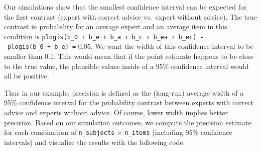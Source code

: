 \documentclass[
  man,floatsintext]{apa6}
\begin{document}
Our simulations show that the smallest confidence interval can be expected for the first contrast (expert with correct advice vs.~expert without advice).
The true contrast in probability for an average expert and an average item in this condition is \texttt{plogis(b\_0\ +\ b\_e\ +\ b\_a\ +\ b\_c\ +\ b\_ea\ +\ b\_ec)\ -\ plogis(b\_0\ +\ b\_e)\ =} \(0.05\).
We want the width of this confidence interval to be smaller than 0.1.
This would mean that if the point estimate happens to be close to the true value, the plausible values inside of a 95\% confidence interval would all be positive.

Thus in our example, precision is defined as the (long-run) average width of a 95\% confidence interval for the probability contrast between experts with correct advice and experts without advice.
Of course, lower width implies better precision.
Based on our simulation outcomes, we compute the precision estimate for each combination of \texttt{n\_subjects} \(\times\) \texttt{n\_items} (including 95\% confidence intervals) and visualize the results with the following code.
\end{document}
